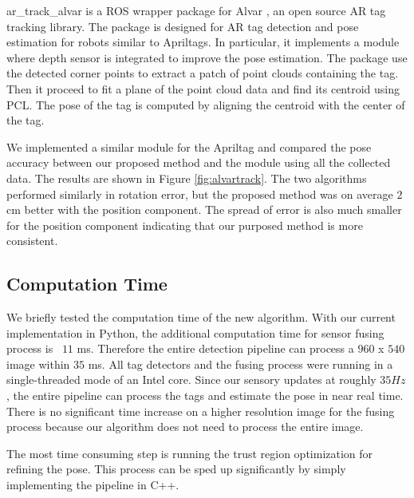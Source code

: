 ar\_track\_alvar is a ROS wrapper package for Alvar \citep{alvartrack}, an open source AR tag tracking library. The package is designed for AR tag detection and pose estimation for robots similar to Apriltags. In particular, it implements a module where depth sensor is integrated to improve the pose estimation. The package use the detected corner points to extract a patch of point clouds containing the tag. Then it proceed to fit a plane of the point cloud data and find its centroid using PCL. The pose of the tag is computed by aligning the centroid with the center of the tag.   

We implemented a similar module for the Apriltag and compared the pose accuracy between our proposed method and the module using all the collected data. The results are shown in Figure \ref{fig:alvartrack}. The two algorithms performed similarly in rotation error, but the proposed method was on average $2$ cm better with the position component. The spread of error is also much smaller for the position component indicating that our purposed method is more consistent.

\subsection{Computation Time}
We briefly tested the computation time of the new algorithm. With our current implementation in Python, the additional computation time for sensor fusing process is ~$11$ ms. Therefore the entire detection pipeline can process a $960$ x $540$ image within $35$ ms. All tag detectors and the fusing process were running in a single-threaded mode of an Intel core. Since our sensory updates at roughly $35Hz$, the entire pipeline can process the tags and estimate the pose in near real time. There is no significant time increase on a higher resolution image for the fusing process because our algorithm does not need to process the entire image.

The most time consuming step is running the trust region optimization for refining the pose. This process can be sped up significantly by simply implementing the pipeline in C++.